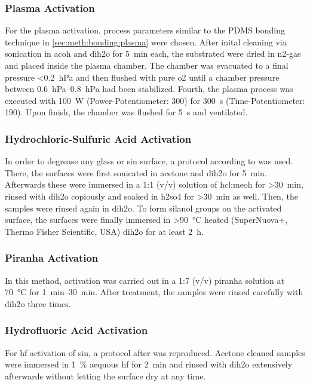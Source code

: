 \subsubsection{Plasma Activation}
For the plasma activation, process parameters similar to the PDMS bonding technique in \ref{sec:meth:bonding:plasma} were chosen. After inital cleaning via sonication in \gls{acoh} and \gls{dih2o} for \SI{5}{\minute} each, the substrated were dried in \gls{n2}-gas and placed inside the plasma chamber. The chamber was evacuated to a final pressure <\SI{0.2}{\hecto\pascal} and then flushed with pure \gls{o2} until a chamber pressure between \SIrange{0.6}{0.8}{\hecto\pascal} had been stabilized. Fourth, the plasma process was executed with \SI{100}{\watt} (Power-Potentiometer: \num{300}) for \SI{300}{\second} (Time-Potentiometer: \num{190}). Upon finish, the chamber was flushed for \SI{5}{\second} and ventilated.
\subsubsection{Hydrochloric-Sulfuric Acid Activation}
In order to degrease any glass or \gls{sin} surface, a protocol according to \citet{lit:chem:Dressick} was used. There, the surfaces were first sonicated in acetone and \gls{dih2o}  for \SI{5}{\minute}. Afterwards these were immersed in a 1:1 (v/v) solution of \gls{hcl}:\gls{meoh} for \SI{>30}{\minute}, rinsed with \gls{dih2o} copiously and soaked in \gls{h2so4} for \SI{>30}{\minute} as well. Then, the samples were rinsed again in \acrlong{dih2o}. To form silanol groups on the activated surface, the surfaces were finally immersed in \SI{>90}{\degreeCelsius} heated (SuperNuova+, Thermo Fisher Scientific, USA) \gls{dih2o}  for at least \SI{2}{\hour}.
\subsubsection{Piranha Activation}
In this method, activation was carried out in a 1:7 (v/v) piranha solution at \SI{70}{\degreeCelsius} for \SIrange{1}{30}{\minute}. After treatment, the samples were rinsed carefully with \gls{dih2o} three times.
\subsubsection{Hydrofluoric Acid Activation}
For \gls{hf} activation of \gls{sin}, a protocol after \citet{lit:chem:sin:surfacEtchingandMod} was reproduced. Acetone cleaned samples were immersed in \SI{1}{\percent} aequous \gls{hf} for \SI{2}{\minute} and rinsed with \gls{dih2o} extensively afterwards without letting the surface dry at any time.
